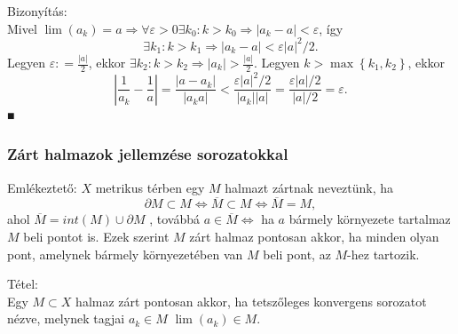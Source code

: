 \documentclass[]{scrartcl}
\newenvironment{tetel}{}{}
\newenvironment{bizonyitas}{}{}
\begin{document}
\begin{bizonyitas}

Bizonyítás:\\
Mivel
\(\left. \lim\left( a_{k} \right) = a\Rightarrow\forall\varepsilon > 0\exists k_{0}:k > k_{0}\Rightarrow\left| {a_{k} - a} \right| < \varepsilon \right.\),
így
\[\left. \exists k_{1}:k > k_{1}\Rightarrow\left| {a_{k} - a} \right| < \varepsilon\left| a \right|^{2}/2 \right..\]
Legyen \(\varepsilon: = \frac{\left| a \right|}{2}\), ekkor
\(\left. \exists k_{2}:k > k_{2}\Rightarrow\left| a_{k} \right| > \frac{\left| a \right|}{2} \right.\).
Legyen \(k > \max\left\{ {k_{1},k_{2}} \right\}\), ekkor
\[{\left| {\frac{1}{a_{k}} - \frac{1}{a}} \right| = \frac{\left| {a - a_{k}} \right|}{\left| {a_{k}a} \right|} < \frac{\varepsilon\left| a \right|^{2}/2}{\left| a_{k} \right|\left| a \right|} = \frac{\varepsilon\left| a \right|/2}{\left| a \right|/2} = \varepsilon}.\]
■

\end{bizonyitas}

\subsubsection{Zárt halmazok jellemzése
sorozatokkal}\label{zart-halmazok-jellemzese-sorozatokkal}

Emlékeztető: \(X\) metrikus térben egy \(M\) halmazt zártnak neveztünk,
ha
\[\left. \partial M \subset M\Leftrightarrow\overline{M} \subset M\Leftrightarrow\overline{M} = M \right.,\]
ahol \(\overline{M} = {int}\left( M \right) \cup \partial M\) , továbbá
\(\left. a \in \overline{M}\Leftrightarrow \right.\) ha \(a\) bármely
környezete tartalmaz \(M\) beli pontot is. Ezek szerint \(M\) zárt
halmaz pontosan akkor, ha minden olyan pont, amelynek bármely
környezetében van \(M\) beli pont, az \(M\)-hez tartozik.

\begin{tetel}

Tétel:\\
Egy \(M \subset X\) halmaz zárt pontosan akkor, ha tetszőleges
konvergens sorozatot nézve, melynek tagjai \(a_{k} \in M\)
\(\lim\left( a_{k} \right) \in M\).

\end{tetel}
\end{document}
